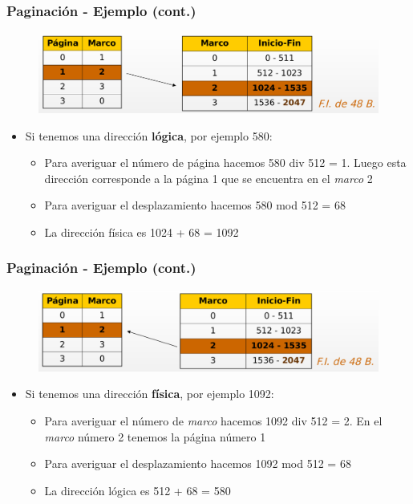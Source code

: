 \begin{frame}
  \frametitle{Paginación - Ejemplo (cont.)}
  \begin{figure}
    \includegraphics[scale=0.2]{images/pagination2.png}
  \end{figure}
  \begin{itemize}
  	\item Si tenemos una dirección \textbf{lógica}, por ejemplo 580:
  	\begin{itemize}
  		\item Para averiguar el número de página hacemos 580 div 512 = 1. Luego esta dirección corresponde a la página 1 que se encuentra en el \emph{marco} 2
  		\item Para averiguar el desplazamiento hacemos 580 mod 512 = 68
  		\item La dirección física es 1024 + 68 = 1092
  	\end{itemize}
  \end{itemize}
\end{frame}

\begin{frame}
  \frametitle{Paginación - Ejemplo (cont.)}
  \begin{figure}
    \includegraphics[scale=0.2]{images/pagination3.png}
  \end{figure}
  \begin{itemize}
  	\item Si tenemos una dirección \textbf{física}, por ejemplo 1092:
  	\begin{itemize}
  		\item Para averiguar el número de \emph{marco} hacemos 1092 div 512 = 2. En el \emph{marco} número 2 tenemos la página número 1
  		\item Para averiguar el desplazamiento hacemos 1092 mod 512 = 68
  		\item La dirección lógica es 512 + 68 = 580
  	\end{itemize}
  \end{itemize}
\end{frame}

